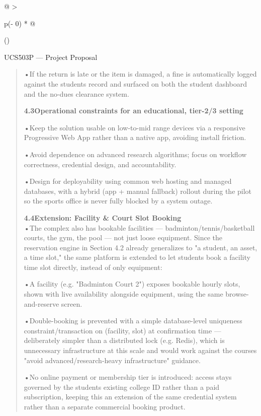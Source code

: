 \documentclass[
]{article}
\begin{document}
\begin{longtable}[]{@{}
  >{\raggedright\arraybackslash}p{(\columnwidth - 0\tabcolsep) * }@{}}
\toprule()
\begin{minipage}[b]{\linewidth}\raggedright
UCS503P --- Project Proposal

\begin{quote}
•If the return is late or the item is damaged, a fine is automatically
logged against the student\textquotesingle s record and surfaced on both
the student dashboard and the no-dues clearance system.

\textbf{4.3Operational constraints for an educational, tier-2/3 setting}

•Keep the solution usable on low-to-mid range devices via a responsive
Progressive Web App rather than a native app, avoiding install friction.

•Avoid dependence on advanced research algorithms; focus on workflow
correctness, credential design, and accountability.

•Design for deployability using common web hosting and managed
databases, with a hybrid (app + manual fallback) rollout during the
pilot so the sports office is never fully blocked by a system outage.

\textbf{4.4Extension: Facility \& Court Slot Booking}\\
•The complex also has bookable facilities ---
badminton/tennis/basketball courts, the gym, the pool --- not just loose
equipment. Since the reservation engine in Section 4.2 already
generalizes to "a student, an asset, a time slot," the same platform is
extended to let students book a facility time slot directly, instead of
only equipment:

•A facility (e.g. "Badminton Court 2") exposes bookable hourly slots,
shown with live availability alongside equipment, using the same
browse-and-reserve screen.

•Double-booking is prevented with a simple database-level uniqueness\\
constraint/transaction on (facility, slot) at confirmation time ---
deliberately simpler than a distributed lock (e.g. Redis), which is
unnecessary infrastructure at this scale and would work against the
course\textquotesingle s "avoid advanced/research-heavy infrastructure"
guidance.

•No online payment or membership tier is introduced: access stays
governed by the student\textquotesingle s existing college ID rather
than a paid subscription, keeping this an extension of the same
credential system rather than a separate commercial booking product.


\end{quote}
\end{minipage}
\end{longtable}
\end{document}
